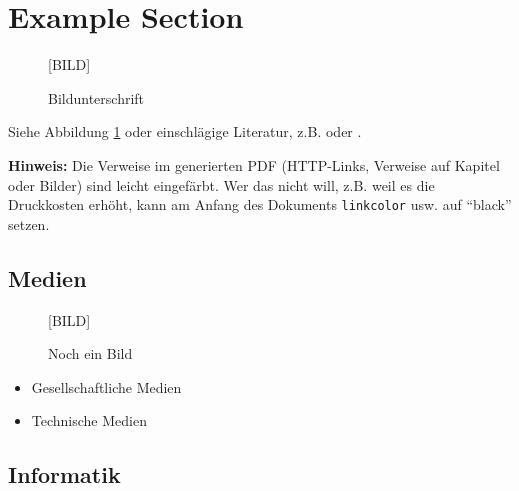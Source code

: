 \documentclass[11pt,a4paper,twoside]{article}
\begin{document}
\section{Example Section}

\begin{figure}%


  \begin{center}\LARGE [BILD]\end{center}
  \caption{Bildunterschrift}
  \label{fig:beispielbild}
\end{figure}


Siehe Abbildung \ref{fig:beispielbild} oder einschlägige Literatur, z.B.
\cite[Seite 6]{Brill1992ATagger} oder \cite{Porter1980AnStripping}.

\bigskip %
\textbf{Hinweis:} Die Verweise im generierten PDF (HTTP-Links, Verweise auf Kapitel oder Bilder) sind leicht eingefärbt. Wer das nicht will, z.B. weil es die Druckkosten erhöht, kann am Anfang des Dokuments \texttt{linkcolor} usw. auf ``black'' setzen.


\subsection{Medien}

\begin{figure}
  \begin{center}\LARGE [BILD]\end{center}
  \caption{Noch ein Bild}
  \label{fig:beispielbild2}
\end{figure}

\begin{itemize}
  \item Gesellschaftliche Medien
  \item Technische Medien
\end{itemize}


\subsection{Informatik}
\end{document}
